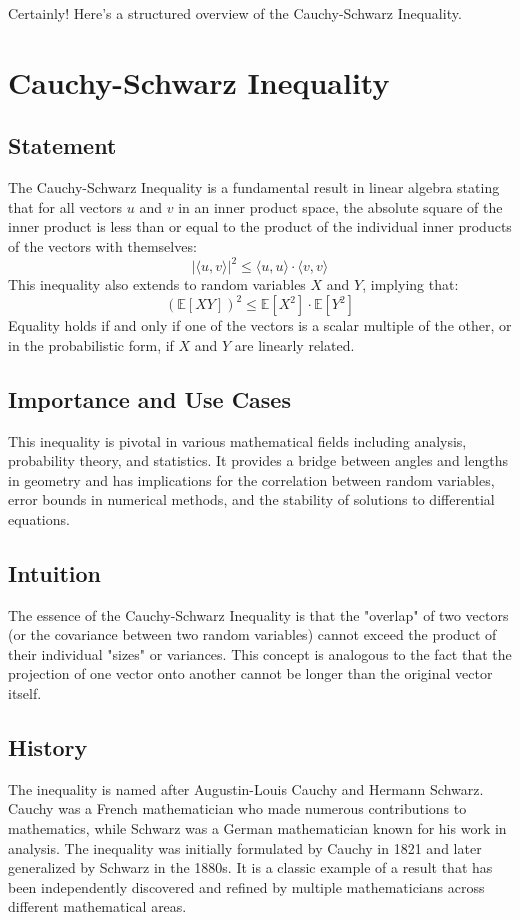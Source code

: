 \documentclass{article}
\begin{document}
Certainly! Here's a structured overview of the Cauchy-Schwarz Inequality.

\section{Cauchy-Schwarz Inequality}

\subsection{Statement}
The Cauchy-Schwarz Inequality is a fundamental result in linear algebra stating that for all vectors \( u \) and \( v \) in an inner product space, the absolute square of the inner product is less than or equal to the product of the individual inner products of the vectors with themselves:
\[ | \langle u, v \rangle |^2 \leq \langle u, u \rangle \cdot \langle v, v \rangle \]
This inequality also extends to random variables \( X \) and \( Y \), implying that:
\[ (\mathbb{E}[XY])^2 \leq \mathbb{E}[X^2] \cdot \mathbb{E}[Y^2] \]
Equality holds if and only if one of the vectors is a scalar multiple of the other, or in the probabilistic form, if \( X \) and \( Y \) are linearly related.

\subsection{Importance and Use Cases}
This inequality is pivotal in various mathematical fields including analysis, probability theory, and statistics. It provides a bridge between angles and lengths in geometry and has implications for the correlation between random variables, error bounds in numerical methods, and the stability of solutions to differential equations.

\subsection{Intuition}
The essence of the Cauchy-Schwarz Inequality is that the "overlap" of two vectors (or the covariance between two random variables) cannot exceed the product of their individual "sizes" or variances. This concept is analogous to the fact that the projection of one vector onto another cannot be longer than the original vector itself.

\subsection{History}
The inequality is named after Augustin-Louis Cauchy and Hermann Schwarz. Cauchy was a French mathematician who made numerous contributions to mathematics, while Schwarz was a German mathematician known for his work in analysis. The inequality was initially formulated by Cauchy in 1821 and later generalized by Schwarz in the 1880s. It is a classic example of a result that has been independently discovered and refined by multiple mathematicians across different mathematical areas.
\end{document}
